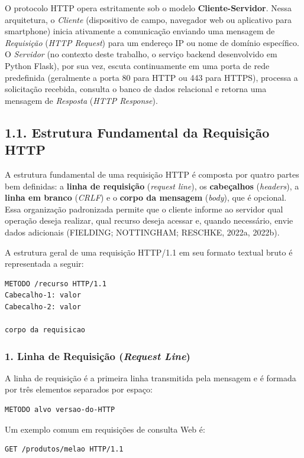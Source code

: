O protocolo HTTP opera estritamente sob o modelo \textbf{Cliente-Servidor}. Nessa arquitetura, o \textit{Cliente} (dispositivo de campo, navegador web ou aplicativo para smartphone) inicia ativamente a comunicação enviando uma mensagem de \textit{Requisição} (\textit{HTTP Request}) para um endereço IP ou nome de domínio específico. O \textit{Servidor} (no contexto deste trabalho, o serviço backend desenvolvido em Python Flask), por sua vez, escuta continuamente em uma porta de rede predefinida (geralmente a porta 80 para HTTP ou 443 para HTTPS), processa a solicitação recebida, consulta o banco de dados relacional e retorna uma mensagem de \textit{Resposta} (\textit{HTTP Response}).

\subsection*{1.1. Estrutura Fundamental da Requisição HTTP}

A estrutura fundamental de uma requisição HTTP é composta por quatro partes bem definidas: a \textbf{linha de requisição} (\textit{request line}), os \textbf{cabeçalhos} (\textit{headers}), a \textbf{linha em branco} (\textit{CRLF}) e o \textbf{corpo da mensagem} (\textit{body}), que é opcional. Essa organização padronizada permite que o cliente informe ao servidor qual operação deseja realizar, qual recurso deseja acessar e, quando necessário, envie dados adicionais (FIELDING; NOTTINGHAM; RESCHKE, 2022a, 2022b).

A estrutura geral de uma requisição HTTP/1.1 em seu formato textual bruto é representada a seguir:

\begin{lstlisting}
METODO /recurso HTTP/1.1
Cabecalho-1: valor
Cabecalho-2: valor

corpo da requisicao
\end{lstlisting}

\subsubsection*{1. Linha de Requisição (\textit{Request Line})}

A linha de requisição é a primeira linha transmitida pela mensagem e é formada por três elementos separados por espaço:
\begin{lstlisting}
METODO alvo versao-do-HTTP
\end{lstlisting}

Um exemplo comum em requisições de consulta Web é:
\begin{lstlisting}
GET /produtos/melao HTTP/1.1
\end{lstlisting}

